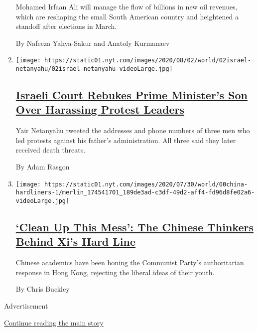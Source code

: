 \begin{enumerate}
  Mohamed Irfaan Ali will manage the flow of billions in new oil
  revenues, which are reshaping the small South American country and
  heightened a standoff after elections in March.

  By Nafeeza Yahya-Sakur and Anatoly Kurmanaev
\item
  \texttt{[image: https://static01.nyt.com/images/2020/08/02/world/02israel-netanyahu/02israel-netanyahu-videoLarge.jpg]}

  \hypertarget{israeli-court-rebukes-prime-ministers-son-over-harassing-protest-leaders}{%
  \subsection{\texorpdfstring{\href{/2020/08/02/world/middleeast/israel-Netanyahus-son-tweets.html}{Israeli
  Court Rebukes Prime Minister's Son Over Harassing Protest
  Leaders}}{Israeli Court Rebukes Prime Minister's Son Over Harassing Protest Leaders}}\label{israeli-court-rebukes-prime-ministers-son-over-harassing-protest-leaders}}

  Yair Netanyahu tweeted the addresses and phone numbers of three men
  who led protests against his father's administration. All three said
  they later received death threats.

  By Adam Rasgon
\item
  \texttt{[image: https://static01.nyt.com/images/2020/07/30/world/00china-hardliners-1/merlin\_174541701\_189de3ad-c3df-49d2-aff4-fd96d8fe02a6-videoLarge.jpg]}

  \hypertarget{clean-up-this-mess-the-chinese-thinkers-behind-xis-hard-line}{%
  \subsection{\texorpdfstring{\href{/2020/08/02/world/asia/china-hong-kong-national-security-law.html}{`Clean
  Up This Mess': The Chinese Thinkers Behind Xi's Hard
  Line}}{`Clean Up This Mess': The Chinese Thinkers Behind Xi's Hard Line}}\label{clean-up-this-mess-the-chinese-thinkers-behind-xis-hard-line}}

  Chinese academics have been honing the Communist Party's authoritarian
  response in Hong Kong, rejecting the liberal ideas of their youth.

  By Chris Buckley
\end{enumerate}

Advertisement

\protect\hyperlink{after-mid1}{Continue reading the main story}

